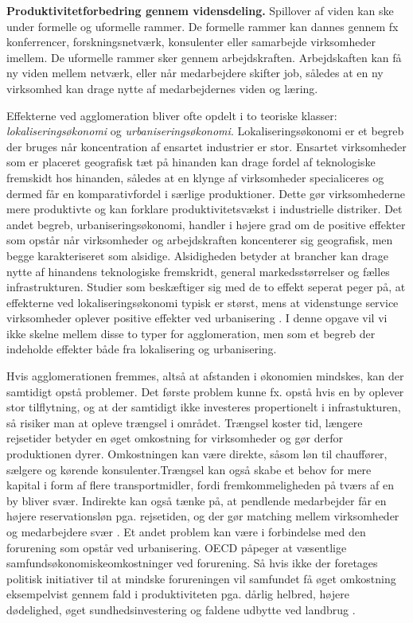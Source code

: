 \documentclass[a4paper, 12pt, titlepage]{article}
\begin{document}
\textbf{Produktivitetforbedring gennem vidensdeling.} Spillover af viden kan ske under formelle og uformelle rammer. De formelle rammer kan dannes gennem fx konferrencer, forskningsnetværk, konsulenter eller samarbejde virksomheder imellem. De uformelle rammer sker gennem arbejdskraften. Arbejdskaften kan få ny viden mellem netværk, eller når medarbejdere skifter job, således at en ny virksomhed kan drage nytte af medarbejdernes viden og læring. \cite{sorensen2014infrastruktur}  


Effekterne ved agglomeration bliver ofte opdelt i to teoriske klasser: \emph{lokaliseringsøkonomi} og \emph{urbaniseringsøkonomi}. Lokaliseringsøkonomi er et begreb der bruges når koncentration af ensartet industrier er stor. Ensartet virksomheder som er placeret geografisk tæt på hinanden kan drage fordel af teknologiske fremskidt hos hinanden, således at en klynge af virksomheder specialiceres og dermed får en komparativfordel i særlige produktioner. Dette gør virksomhederne mere produktivte og kan forklare produktivitetsvækst i industrielle distriker.  Det andet begreb, urbaniseringsøkonomi, handler i højere grad om de positive effekter som opstår når virksomheder og arbejdskraften koncenterer sig geografisk, men begge karakteriseret som alsidige. Alsidigheden betyder at brancher kan drage nytte af hinandens teknologiske fremskridt, general markedsstørrelser og fælles infrastrukturen. Studier som beskæftiger sig med de to effekt seperat peger på, at effekterne ved lokaliseringsøkonomi typisk er størst, mens at videnstunge service virksomheder oplever positive effekter ved urbanisering \cite{melo2009meta}. I denne opgave vil vi ikke skelne mellem disse to typer for agglomeration, men som et begreb der indeholde effekter både fra lokalisering og urbanisering.


Hvis agglomerationen fremmes, altså at afstanden i økonomien mindskes, kan der samtidigt opstå problemer. Det første problem kunne fx. opstå hvis en by oplever stor tilflytning, og at der samtidigt ikke investeres propertionelt i infrastukturen, så risiker man at opleve trængsel i området. Trængsel koster tid, længere rejsetider betyder en øget omkostning for virksomheder og gør derfor produktionen dyrer. Omkostningen kan være direkte, såsom løn til chauffører, sælgere og kørende konsulenter.Trængsel kan også skabe et behov for mere kapital i form af flere transportmidler, fordi fremkommeligheden på tværs af en by bliver svær. Indirekte kan også tænke på, at pendlende medarbejder får en højere reservationsløn pga. rejsetiden, og der gør matching mellem virksomheder og medarbejdere svær \cite{sorensen2014infrastruktur}. Et andet problem kan være i forbindelse med den forurening som opstår ved urbanisering. OECD påpeger at væsentlige samfundsøkonomiskeomkostninger ved forurening. Så hvis ikke der foretages politisk initiativer til at mindske forureningen vil samfundet få øget omkostning eksempelvist gennem fald i produktiviteten pga. dårlig helbred, højere dødelighed, øget sundhedsinvestering og faldene udbytte ved landbrug \cite{klimonteconomic}.
\end{document}
